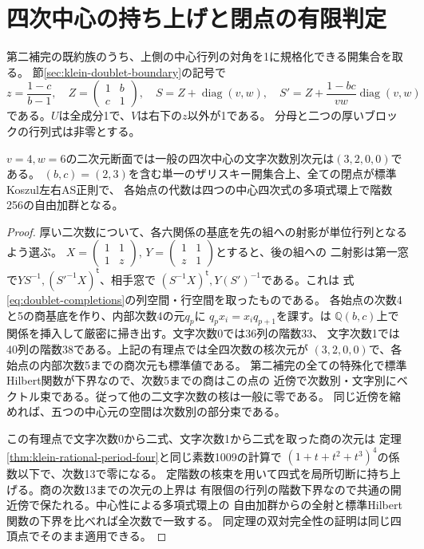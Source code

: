 \section{四次中心の持ち上げと閉点の有限判定}
\label{sec:klein-quartic-center-lift}
第二補完の既約族のうち、上側の中心行列の対角を1に規格化できる開集合を取る。
節\ref{sec:klein-doublet-boundary}の記号で
\[
 z=\frac{1-c}{b-1},\quad Z=\begin{pmatrix}1&b\\c&1\end{pmatrix},
 \quad S=Z+\operatorname{diag}(v,w),\quad
 S'=Z+\frac{1-bc}{vw}\operatorname{diag}(v,w)
\]
である。$U$は全成分1で、$V$は右下の$z$以外が1である。
分母と二つの厚いブロックの行列式は非零とする。

\begin{theorem}\label{thm:klein-quartic-center-slice}
$v=4,w=6$の二次元断面では一般の四次中心の文字次数別次元は$(3,2,0,0)$である。
$(b,c)=(2,3)$を含む単一のザリスキー開集合上、全ての閉点が標準Koszul左右AS正則で、
各始点の代数は四つの中心四次式の多項式環上で階数256の自由加群となる。
\end{theorem}
\begin{proof}
厚い二次数について、各六関係の基底を先の組への射影が単位行列となるよう選ぶ。
$X=\left(\begin{smallmatrix}1&1\\1&z\end{smallmatrix}\right)$,
$Y=\left(\begin{smallmatrix}1&1\\z&1\end{smallmatrix}\right)$とすると、後の組への
二射影は第一窓で$YS^{-1},(S'^{-1}X)^{\mathsf t}$、相手窓で
$(S^{-1}X)^{\mathsf t},Y(S')^{-1}$である。これは
式\eqref{eq:doublet-completions}の列空間・行空間を取ったものである。
各始点の次数4と5の商基底を作り、内部次数4の元$q_p$に
$q_p x_i=x_i q_{p+1}$を課す。は
$\mathbb Q(b,c)$上で関係を挿入して厳密に掃き出す。文字次数0では36列の階数33、
文字次数1では40列の階数38である。上記の有理点では全四次数の核次元が
$(3,2,0,0)$で、各始点の内部次数5までの商次元も標準値である。
第二補完の全ての特殊化で標準Hilbert関数が下界なので、次数5までの商はこの点の
近傍で次数別・文字別にベクトル束である。従って他の二文字次数の核は一般に零である。
同じ近傍を縮めれば、五つの中心元の空間は次数別の部分束である。

この有理点で文字次数0から二式、文字次数1から二式を取った商の次元は
定理\ref{thm:klein-rational-period-four}と同じ素数1009の計算で
$(1+t+t^2+t^3)^4$の係数以下で、次数13で零になる。
定階数の核束を用いて四式を局所切断に持ち上げる。商の次数13までの次元の上界は
有限個の行列の階数下界なので共通の開近傍で保たれる。中心性による多項式環上の
自由加群からの全射と標準Hilbert関数の下界を比べれば全次数で一致する。
同定理の双対完全性の証明は同じ四頂点でそのまま適用できる。
\end{proof}

